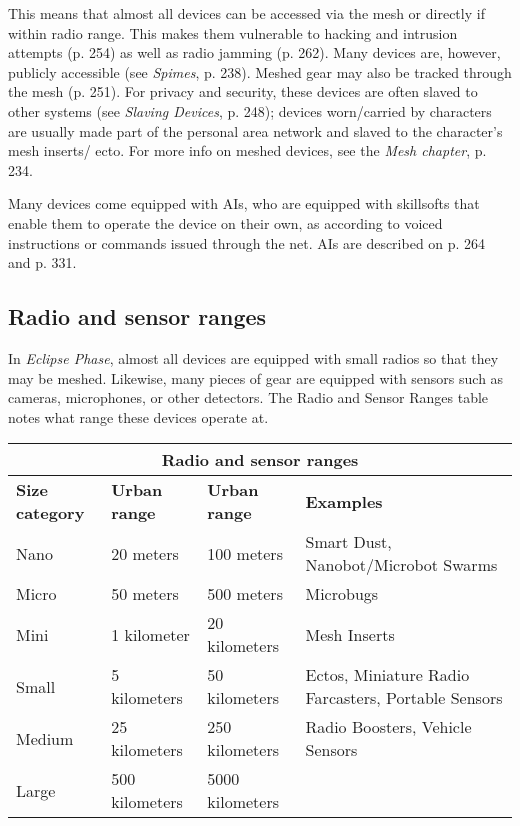 This means that almost all devices can be accessed via the mesh or directly if within radio range. This makes them vulnerable to hacking and intrusion attempts (p. 254) as well as radio jamming (p. 262). Many devices are, however, publicly accessible (see \emph{Spimes}, p. 238). Meshed gear may also be tracked through the mesh (p. 251). For privacy and security, these devices are often slaved to other systems (see \emph{Slaving Devices}, p. 248); devices worn/carried by characters are usually made part of the personal area network and slaved to the character’s mesh inserts/ ecto. For more info on meshed devices, see the \emph{Mesh chapter}, p. 234.

Many devices come equipped with AIs, who are equipped with skillsofts that enable them to operate the device on their own, as according to voiced instructions or commands issued through the net. AIs are described on p. 264 and p. 331.


\subsection{Radio and sensor ranges}
\label{sec:radio-sensor-ranges}

In \emph{Eclipse Phase}, almost all devices are equipped with small radios so that they may be meshed. Likewise, many pieces of gear are equipped with sensors such as cameras, microphones, or other detectors. The Radio and Sensor Ranges table notes what range these devices operate at.

\begin{table}
\begin{tabularx}{\textwidth}{|l|l|l|X|}
\hline
\multicolumn{4}{|c|}{\textbf{Radio and sensor ranges}}			\\
\hline
\textbf{Size category}	& \textbf{Urban range}	& \textbf{Urban range}	& \textbf{Examples} \\
\hline
Nano 				& 20 meters 			& 100 meters			& Smart Dust, Nanobot/Microbot Swarms \\ Micro				& 50 meters			& 500 meters			& Microbugs \\ Mini					& 1 kilometer			& 20 kilometers		& Mesh Inserts \\ Small				& 5 kilometers			& 50 kilometers		& Ectos, Miniature Radio Farcasters, Portable Sensors \\ Medium				& 25 kilometers		& 250 kilometers		& Radio Boosters, Vehicle Sensors \\ Large				& 500 kilometers		& 5000 kilometers		& \\
\hline
\end{tabularx}
\label{tab:radio-sensor-ranges}
\end{table}



